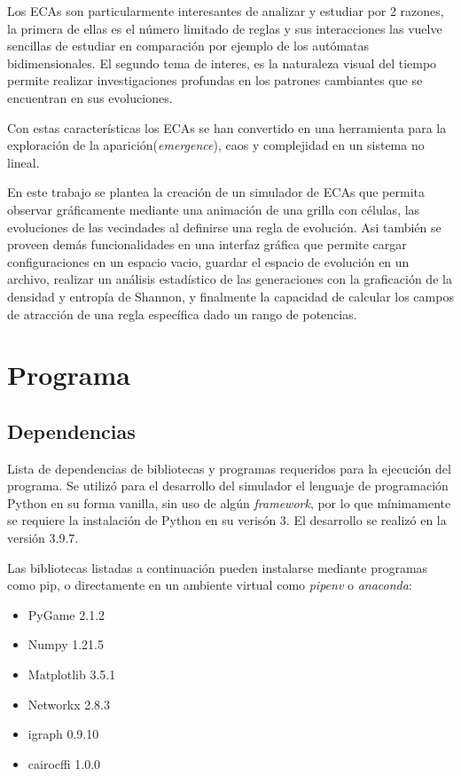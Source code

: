 \documentclass[]{article}
\begin{document}
		\hfill\break
		\justifying
		Los ECAs son particularmente interesantes de analizar y estudiar por 2 razones, la primera de ellas es el número limitado de reglas y sus interacciones las vuelve sencillas de estudiar en comparación por ejemplo de los autómatas bidimensionales. El segundo tema de interes, es la naturaleza visual del tiempo permite realizar investigaciones profundas en los patrones cambiantes que se encuentran en sus evoluciones.
		
		\hfill\break
		\justifying
		Con estas características los ECAs se han convertido en una herramienta para la exploración de la aparición(\textit{emergence}), caos y complejidad en un sistema no lineal.
		
		\hfill\break
		\justifying
		En este trabajo se plantea la creación de un simulador de ECAs que permita observar gráficamente mediante una animación de una grilla con células, las evoluciones de las vecindades al definirse una regla de evolución. Asi también se proveen demás funcionalidades en una interfaz gráfica que permite cargar configuraciones en un espacio vacio, guardar el espacio de evolución en un archivo, realizar un análisis estadístico de las generaciones con la graficación de la densidad y entropía de Shannon, y finalmente la capacidad de calcular los campos de atracción de una regla específica dado un rango de potencias.
	
	\newpage
	\section{Programa}
		\subsection{Dependencias}
			\justifying
			Lista de dependencias de bibliotecas y programas requeridos para la ejecución del programa.
			Se utilizó para el desarrollo del simulador el lenguaje de programación Python en su forma vanilla, sin uso de algún \textit{framework}, por lo que mínimamente se requiere la instalación de Python en su verisón 3. El desarrollo se realizó en la versión 3.9.7.
			
			\hfill\break
			\justifying
			Las bibliotecas listadas a continuación pueden instalarse mediante programas como pip, o directamente en un ambiente virtual como \textit{pipenv} o \textit{anaconda}:
			\begin{itemize}
				\item PyGame 2.1.2
				\item Numpy 1.21.5
				\item Matplotlib 3.5.1
				\item Networkx 2.8.3
				\item igraph 0.9.10
				\item cairocffi 1.0.0
			\end{itemize}
		
\end{document}

